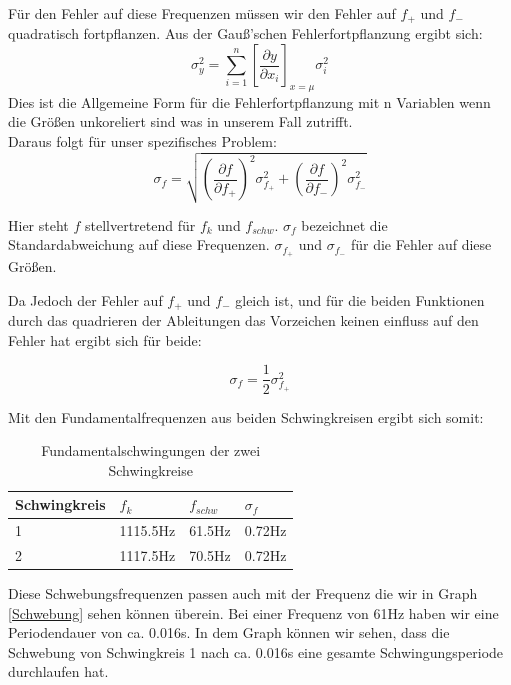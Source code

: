 \documentclass[twoside]{protokoll}
\begin{document}
Für den Fehler auf diese Frequenzen müssen wir den Fehler auf $f_+$ und $f_-$ quadratisch fortpflanzen. Aus der Gauß'schen Fehlerfortpflanzung ergibt sich:
\begin{equation}
	\sigma_y^2 = \sum_{i=1}^n\left[\frac{\partial y}{\partial x_i}\right]_{x=\mu}\sigma_{i}^2
\label{Fehlerfortpflanzung}
\end{equation}
Dies ist die Allgemeine Form für die Fehlerfortpflanzung mit n Variablen wenn die Größen unkoreliert sind was in unserem Fall zutrifft.\\
Daraus folgt für unser spezifisches Problem:
\begin{equation}
\sigma_f =\sqrt{ \left(\frac{\partial f}{\partial f_+}\right)^2\sigma_{f_+}^2 + \left(\frac{\partial f}{\partial f_-}\right)^2\sigma_{f_-}^2}
\end{equation}

Hier steht $f$ stellvertretend für $f_k$ und $f_{schw}$. $\sigma_f$ bezeichnet die Standardabweichung auf diese Frequenzen. 
$ \sigma_{f_+} $ und $ \sigma_{f_-}$ für die Fehler auf diese Größen.

Da Jedoch der Fehler auf $f_+$ und $f_-$ gleich ist, und für die beiden Funktionen durch das quadrieren der Ableitungen das Vorzeichen keinen einfluss auf den Fehler hat ergibt sich für beide:

\begin{equation}
\sigma_f = \frac{1}{2}\sigma_{f_+}^2
\label{Fehler auf Schwebung}
\end{equation}

Mit den Fundamentalfrequenzen aus beiden Schwingkreisen ergibt sich somit:

\begin{table}[H]
    \centering
    \begin{tabularx}{1\textwidth}{X X X X} %
        \toprule
        \textbf{Schwingkreis} & \textbf{$f_k$} & \textbf{$f_{schw}$} & \textbf{$\sigma_f$} \\
        \midrule
        1 & 1115.5Hz & 61.5Hz & 0.72Hz\\
        2 & 1117.5Hz & 70.5Hz & 0.72Hz \\
        \bottomrule
    \end{tabularx}
    \caption{Fundamentalschwingungen der zwei Schwingkreise}
    \label{•}
\end{table} 

Diese Schwebungsfrequenzen passen auch mit der Frequenz die wir in Graph \ref{Schwebung} sehen können überein. 
Bei einer Frequenz von 61Hz haben wir eine Periodendauer von ca. 0.016s. 
In dem Graph können wir sehen, dass die Schwebung von Schwingkreis 1 nach ca. 0.016s eine gesamte Schwingungsperiode durchlaufen hat.
\end{document}
